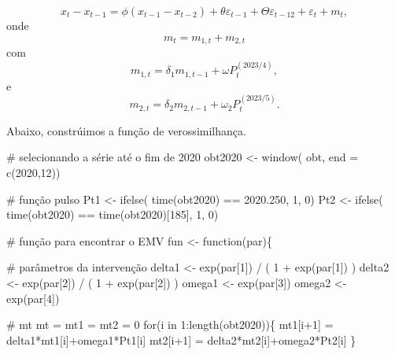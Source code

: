 \documentclass[
  letterpaper,
  DIV=11,
  numbers=noendperiod]{scrartcl}
\newenvironment{Shaded}{\begin{snugshade}}{\end{snugshade}}
\newcommand{\AttributeTok}[1]{\textcolor[rgb]{0.40,0.45,0.13}{#1}}
\newcommand{\CommentTok}[1]{\textcolor[rgb]{0.37,0.37,0.37}{#1}}
\newcommand{\ControlFlowTok}[1]{\textcolor[rgb]{0.00,0.23,0.31}{#1}}
\newcommand{\DecValTok}[1]{\textcolor[rgb]{0.68,0.00,0.00}{#1}}
\newcommand{\FloatTok}[1]{\textcolor[rgb]{0.68,0.00,0.00}{#1}}
\newcommand{\FunctionTok}[1]{\textcolor[rgb]{0.28,0.35,0.67}{#1}}
\newcommand{\NormalTok}[1]{\textcolor[rgb]{0.00,0.23,0.31}{#1}}
\newcommand{\OtherTok}[1]{\textcolor[rgb]{0.00,0.23,0.31}{#1}}
\newcommand{\SpecialCharTok}[1]{\textcolor[rgb]{0.37,0.37,0.37}{#1}}
\theoremstyle{plain}
\theoremstyle{plain}
\theoremstyle{definition}
\theoremstyle{definition}
\theoremstyle{remark}
\begin{document}
\[x_t-x_{t-1}=\phi(x_{t-1}-x_{t-2}) + \theta\varepsilon_{t-1}+\Theta \varepsilon_{t-12}+\varepsilon_t+m_t,\]
onde \[m_t=m_{1,t}+m_{2,t}\] com
\[m_{1,t}=\delta_1 m_{1,t-1}+\omega P_t^{(2023/4)},\] e
\[m_{2,t}=\delta_2 m_{2,t-1}+\omega_2P_{t}^{(2023/5)}.\]

Abaixo, constrúimos a função de verossimilhança.

\begin{Shaded}
\begin{Highlighting}[]
\CommentTok{\# selecionando a série até o fim de 2020}
\NormalTok{obt2020 }\OtherTok{\textless{}{-}} \FunctionTok{window}\NormalTok{( obt, }\AttributeTok{end =} \FunctionTok{c}\NormalTok{(}\DecValTok{2020}\NormalTok{,}\DecValTok{12}\NormalTok{))}

\CommentTok{\# função pulso  }
\NormalTok{Pt1 }\OtherTok{\textless{}{-}} \FunctionTok{ifelse}\NormalTok{( }\FunctionTok{time}\NormalTok{(obt2020) }\SpecialCharTok{==} \FloatTok{2020.250}\NormalTok{, }\DecValTok{1}\NormalTok{, }\DecValTok{0}\NormalTok{)}
\NormalTok{Pt2 }\OtherTok{\textless{}{-}} \FunctionTok{ifelse}\NormalTok{( }\FunctionTok{time}\NormalTok{(obt2020) }\SpecialCharTok{==} \FunctionTok{time}\NormalTok{(obt2020)[}\DecValTok{185}\NormalTok{], }\DecValTok{1}\NormalTok{, }\DecValTok{0}\NormalTok{)}

\CommentTok{\# função para encontrar o EMV}
\NormalTok{fun }\OtherTok{\textless{}{-}} \ControlFlowTok{function}\NormalTok{(par)\{}

\CommentTok{\# parâmetros da intervenção}
\NormalTok{delta1 }\OtherTok{\textless{}{-}} \FunctionTok{exp}\NormalTok{(par[}\DecValTok{1}\NormalTok{]) }\SpecialCharTok{/}\NormalTok{ ( }\DecValTok{1} \SpecialCharTok{+} \FunctionTok{exp}\NormalTok{(par[}\DecValTok{1}\NormalTok{]) )}
\NormalTok{delta2 }\OtherTok{\textless{}{-}} \FunctionTok{exp}\NormalTok{(par[}\DecValTok{2}\NormalTok{]) }\SpecialCharTok{/}\NormalTok{ ( }\DecValTok{1} \SpecialCharTok{+} \FunctionTok{exp}\NormalTok{(par[}\DecValTok{2}\NormalTok{]) )}
\NormalTok{omega1 }\OtherTok{\textless{}{-}} \FunctionTok{exp}\NormalTok{(par[}\DecValTok{3}\NormalTok{])}
\NormalTok{omega2 }\OtherTok{\textless{}{-}} \FunctionTok{exp}\NormalTok{(par[}\DecValTok{4}\NormalTok{])}

\CommentTok{\# mt}
\NormalTok{mt }\OtherTok{=}\NormalTok{ mt1 }\OtherTok{=}\NormalTok{ mt2 }\OtherTok{=} \DecValTok{0}
\ControlFlowTok{for}\NormalTok{(i }\ControlFlowTok{in} \DecValTok{1}\SpecialCharTok{:}\FunctionTok{length}\NormalTok{(obt2020))\{}
\NormalTok{  mt1[i}\SpecialCharTok{+}\DecValTok{1}\NormalTok{] }\OtherTok{=}\NormalTok{ delta1}\SpecialCharTok{*}\NormalTok{mt1[i]}\SpecialCharTok{+}\NormalTok{omega1}\SpecialCharTok{*}\NormalTok{Pt1[i]}
\NormalTok{  mt2[i}\SpecialCharTok{+}\DecValTok{1}\NormalTok{] }\OtherTok{=}\NormalTok{ delta2}\SpecialCharTok{*}\NormalTok{mt2[i]}\SpecialCharTok{+}\NormalTok{omega2}\SpecialCharTok{*}\NormalTok{Pt2[i]}
\NormalTok{\}  }


\end{Highlighting}
\end{Shaded}
\end{document}
